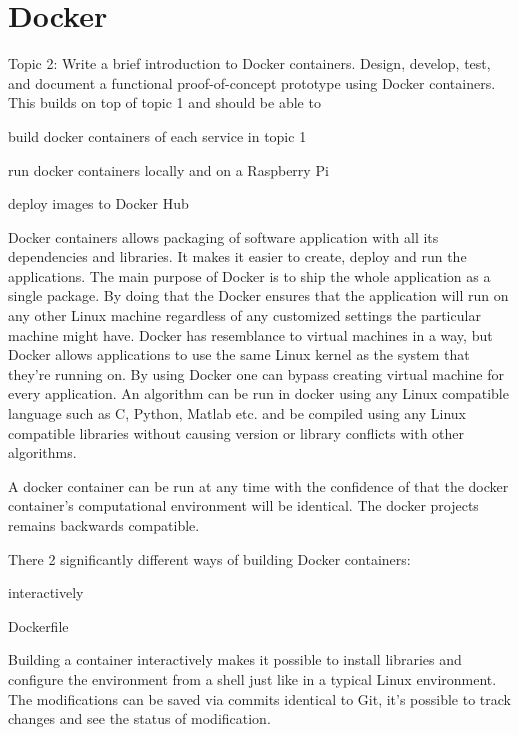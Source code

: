 \chapter{Docker}\label{ch:docker}
Topic 2: Write a brief introduction to Docker containers.  Design, develop, test, and document a functional proof-of-concept prototype using Docker containers. This builds on top of topic 1 and should be able to

\begin{list_type}
\item build docker containers of each service in topic 1
\item run docker containers locally and on a Raspberry Pi
\item deploy images to Docker Hub
\end{list_type} 

Docker containers allows packaging of software application with all its dependencies and libraries. It makes it easier to create, deploy and run the applications. The main purpose of Docker is to ship the whole application as a single package. 
By doing that the Docker ensures that the application will run on any other Linux machine regardless of any customized settings the particular machine might have.
Docker has resemblance to virtual machines in a way, but Docker allows applications to use the same Linux kernel as the system that they’re running on. By using Docker one can bypass creating virtual machine for every application. 
An algorithm can be run in docker using any Linux compatible language such as C, Python, Matlab etc. and be compiled using any Linux compatible libraries without causing version or library conflicts with other algorithms.



A docker container can be run at any time with the confidence of that the docker container’s computational environment will be identical. The docker projects remains backwards compatible. 


There 2 significantly different ways of building Docker containers:

\begin{list_type}
\item interactively
\item Dockerfile
\end{list_type} 

Building a container interactively makes it possible to install libraries and configure the environment from a shell just like in a typical Linux environment. The modifications can be saved via commits identical to Git, it’s possible to track changes and see the status of modification.  

